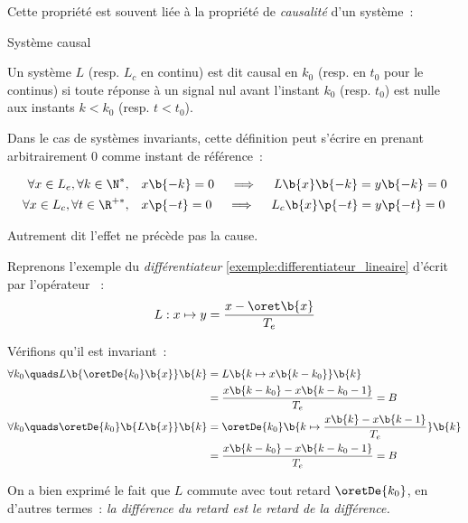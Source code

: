 Cette propriété est souvent liée à la propriété de \emph{causalité}
d'un système~:
\begin{definition}{Système causal}
  
  Un système $L$ (resp. $L_c$ en continu) est dit causal en $k_0$
  (resp. en $t_0$ pour le continus) si toute réponse à un signal nul
  avant l'instant $k_0$ (resp. $t_0$) est nulle aux instants $k<k_0$
  (resp. $t<t_0$).

  Dans le cas de systèmes invariants, cette définition peut s'écrire
  en prenant arbitrairement $0$ comme instant de référence~:

  \begin{align}
    \label{eq:systeme_causal}    
    \forall x\in L_e, \forall k\in\N^*, \quad &x\b{-k}=0 \quad \implies \quad L\b{x}\b{-k}=y\b{-k}=0 \\
    \forall x\in L_c, \forall t\in\R^{+*}, \quad &x\p{-t}=0 \quad \implies \quad L_c\b{x}\p{-t}=y\p{-t}=0   
  \end{align}
\end{definition}

Autrement dit \og{}l'effet ne précède pas la cause.\fg{}
\begin{exemple}
  Reprenons l'exemple du \emph{différentiateur} \ref{exemple:differentiateur_lineaire} d'écrit par l'opérateur ~: $$L : x \mapsto y=\frac{x-\oret\b{x}}{T_e}$$
  
  Vérifions qu'il est invariant~:
  \begin{eqnarray*}
    \forall k_0 \quads L\b{\oretDe{k_0}\b{x}}\b{k} &= L\b{k\mapsto x\b{k-k_0}}\b{k}\\
                                                   &= \frac{x\b{k-k_0}-x\b{k-k_0-1}}{T_e} = B\\
    \forall k_0 \quads \oretDe{k_0}\b{L\b{x}}\b{k} &= \oretDe{k_0}\b{k\mapsto \frac{x\b{k}-x\b{k-1}}{T_e}}\b{k}\\
                                                   &= \frac{x\b{k-k_0}-x\b{k-k_0-1}}{T_e} = B
  \end{eqnarray*}
  
  On a bien exprimé le fait que $L$ commute avec tout retard
  $\oretDe{k_0}$, en d'autres termes~: \emph{la différence du retard est le retard de la différence.}
\end{exemple}


